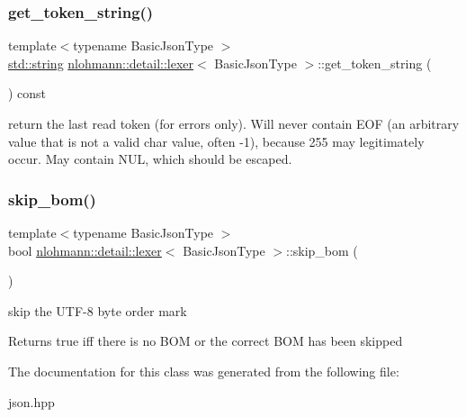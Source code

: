 \subsubsection{\texorpdfstring{get\+\_\+token\+\_\+string()}{get\_token\_string()}}
{\footnotesize\ttfamily template$<$typename Basic\+Json\+Type $>$ \\
\mbox{\hyperlink{namespacenlohmann_1_1detail_a1ed8fc6239da25abcaf681d30ace4985ab45cffe084dd3d20d928bee85e7b0f21}{std\+::string}} \mbox{\hyperlink{classnlohmann_1_1detail_1_1lexer}{nlohmann\+::detail\+::lexer}}$<$ Basic\+Json\+Type $>$\+::get\+\_\+token\+\_\+string (\begin{DoxyParamCaption}{ }\end{DoxyParamCaption}) const\hspace{0.3cm}{\ttfamily [inline]}}

return the last read token (for errors only). Will never contain E\+OF (an arbitrary value that is not a valid char value, often -\/1), because 255 may legitimately occur. May contain N\+UL, which should be escaped. \mbox{\label{classnlohmann_1_1detail_1_1lexer_a709afd52def2e258dac0b8a67dc4ea26}} 
\subsubsection{\texorpdfstring{skip\+\_\+bom()}{skip\_bom()}}
{\footnotesize\ttfamily template$<$typename Basic\+Json\+Type $>$ \\
bool \mbox{\hyperlink{classnlohmann_1_1detail_1_1lexer}{nlohmann\+::detail\+::lexer}}$<$ Basic\+Json\+Type $>$\+::skip\+\_\+bom (\begin{DoxyParamCaption}{ }\end{DoxyParamCaption})\hspace{0.3cm}{\ttfamily [inline]}}



skip the U\+T\+F-\/8 byte order mark 

\begin{DoxyReturn}{Returns}
true iff there is no B\+OM or the correct B\+OM has been skipped 
\end{DoxyReturn}


The documentation for this class was generated from the following file\+:\begin{DoxyCompactItemize}
\item 
json.\+hpp\end{DoxyCompactItemize}
